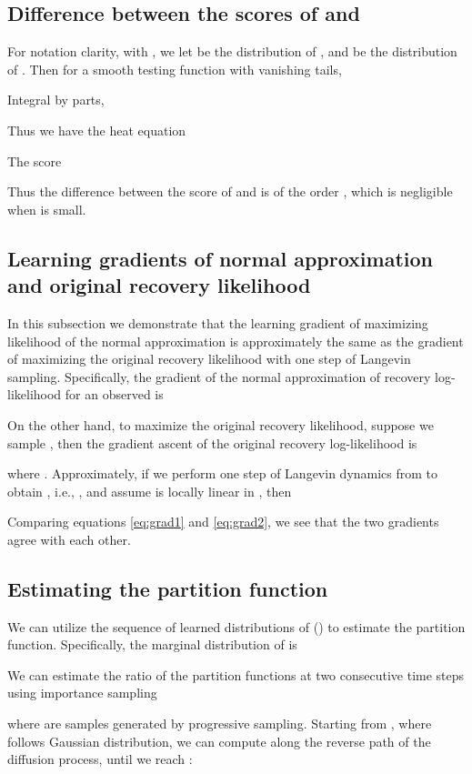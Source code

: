 \documentclass{article} \usepackage{iclr2021_conference,times}
\begin{document}
 
\subsection{Difference between the scores of  and } \label{app:diff}
For notation clarity, with 
 , we let  be the distribution of , and  be the distribution of . Then for a smooth testing function with vanishing tails, 
  
Integral by parts, 

Thus we have the heat equation
 
The score 
 
  Thus the difference between the score of  and  is of the order , which is negligible when  is small. 

\subsection{Learning gradients of normal approximation and original recovery likelihood} \label{app:grad}
In this subsection we demonstrate that the learning gradient of maximizing likelihood of the normal approximation is approximately the same as the gradient of maximizing the original recovery likelihood with one step of Langevin sampling. Specifically, the gradient of the normal approximation of recovery log-likelihood for an observed  is

On the other hand, to maximize the original recovery likelihood, suppose we sample , then the gradient ascent of the original recovery log-likelihood is

where . Approximately, if we perform one step of Langevin dynamics from  to obtain , i.e., , and assume  is locally linear in , then 

Comparing equations \ref{eq:grad1} and \ref{eq:grad2}, we see that the two gradients agree with each other. 


\subsection{Estimating the partition function} \label{app:ais}
We can utilize the sequence of learned distributions of  () to estimate the partition function. Specifically, the marginal distribution of  is

We can estimate the ratio of the partition functions at two consecutive time steps using importance sampling

where  are samples generated by progressive sampling.
Starting from , where  follows Gaussian distribution, we can compute  along the reverse path of the diffusion process, until we reach :
\end{document}
